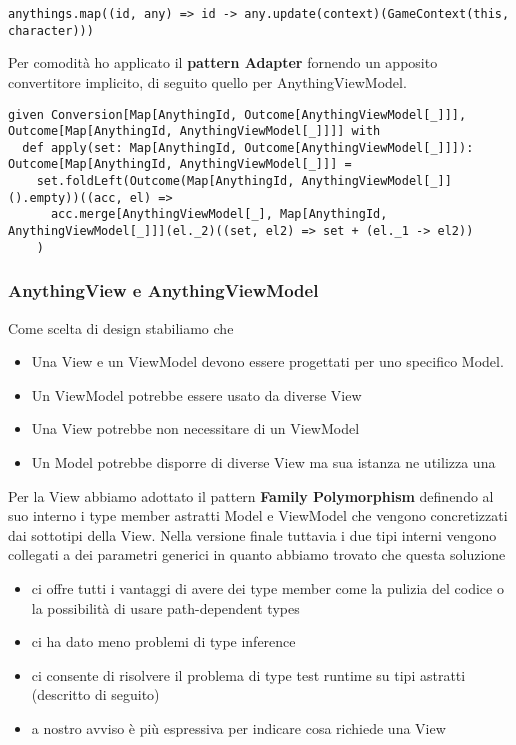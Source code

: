 \begin{lstlisting}[basicstyle=\tiny]
anythings.map((id, any) => id -> any.update(context)(GameContext(this, character)))
\end{lstlisting}

Per comodità ho applicato il \textbf{pattern Adapter} fornendo un apposito convertitore implicito, di seguito quello per AnythingViewModel.

\begin{lstlisting}[basicstyle=\tiny]
given Conversion[Map[AnythingId, Outcome[AnythingViewModel[_]]], Outcome[Map[AnythingId, AnythingViewModel[_]]]] with
  def apply(set: Map[AnythingId, Outcome[AnythingViewModel[_]]]): Outcome[Map[AnythingId, AnythingViewModel[_]]] =
    set.foldLeft(Outcome(Map[AnythingId, AnythingViewModel[_]]().empty))((acc, el) =>
      acc.merge[AnythingViewModel[_], Map[AnythingId, AnythingViewModel[_]]](el._2)((set, el2) => set + (el._1 -> el2))
    )
\end{lstlisting}

\subsubsection{AnythingView e AnythingViewModel}
Come scelta di design stabiliamo che 
\begin{itemize}
    \item Una View e un ViewModel devono essere progettati per uno specifico Model. 
    \item Un ViewModel potrebbe essere usato da diverse View
    \item Una View potrebbe non necessitare di un ViewModel
    \item Un Model potrebbe disporre di diverse View ma sua istanza ne utilizza una
\end{itemize}
Per la View abbiamo adottato il pattern \textbf{Family Polymorphism} definendo al suo interno i type member astratti Model e ViewModel che vengono concretizzati dai sottotipi della View.
Nella versione finale tuttavia i due tipi interni vengono collegati a dei parametri generici in quanto abbiamo trovato che questa soluzione
\begin{itemize}
    \item ci offre tutti i vantaggi di avere dei type member come la pulizia del codice o la possibilità di usare path-dependent types
    \item ci ha dato meno problemi di type inference 
    \item ci consente di risolvere il problema di type test runtime su tipi astratti (descritto di seguito)
    \item a nostro avviso è più espressiva per indicare cosa richiede una View
\end{itemize}

